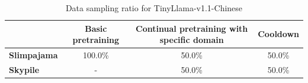 \documentclass{article}
\begin{document}
\begin{table}[htbp]
  \centering
  \small
  \caption{ 
    Data sampling ratio for TinyLlama-v1.1-Chinese
  }
  \begin{tabular}{lccc}
    \toprule
     & \textbf{Basic pretraining}	& \textbf{Continual pretraining with specific domain}	& \textbf{Cooldown}	\\

    \midrule    
    \textbf{Slimpajama} \xspace    & 100.0\%  &  50.0\%	& 50.0\% \\
    \textbf{Skypile}\xspace    & -  &   		50.0\%	& 		50.0\% \\
    \bottomrule
  \end{tabular}
  \label{tab:chinese_sampling}
\end{table}
\end{document}
